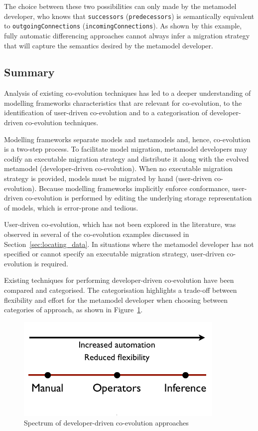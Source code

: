 The choice between these two possibilities can only made by the metamodel developer, who knows that \texttt{successors} (\texttt{predecessors}) is semantically equivalent to \texttt{outgoingConnections} (\texttt{incomingConnections}). As shown by this example, fully automatic differencing approaches cannot always infer a migration strategy that will capture the semantics desired by the metamodel developer.


\subsection{Summary}
Analysis of existing co-evolution techniques has led to a deeper understanding of modelling frameworks characteristics that are relevant for co-evolution, to the identification of user-driven co-evolution and to a categorisation of developer-driven co-evolution techniques.

Modelling frameworks separate models and metamodels and, hence, co-evolution is a two-step process. To facilitate model migration, metamodel developers may codify an executable migration strategy and distribute it along with the evolved metamodel (developer-driven co-evolution). When no executable migration strategy is provided, models must be migrated by hand (user-driven co-evolution). Because modelling frameworks implicitly enforce conformance, user-driven co-evolution is performed by editing the underlying storage representation of models, which is error-prone and tedious.

User-driven co-evolution, which has not been explored in the literature, was observed in several of the co-evolution examples discussed in Section~\ref{sec:locating_data}. In situations where the metamodel developer has not specified or cannot specify an executable migration strategy, user-driven co-evolution is required.

Existing techniques for performing developer-driven co-evolution have been compared and categorised. The categorisation highlights a trade-off between flexibility and effort for the metamodel developer when choosing between categories of approach, as shown in Figure~\ref{fig:developer_driven_coevo_spectrum}.


\begin{figure}[htbp]
	\centering
		\includegraphics[width=10cm]{4.Analysis/spectrum.png}
	\caption{Spectrum of developer-driven co-evolution approaches}
	\label{fig:developer_driven_coevo_spectrum}
\end{figure}

